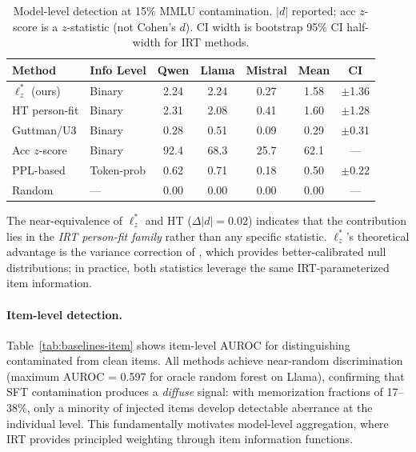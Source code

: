 \documentclass[11pt,a4paper]{article}
\begin{document}
\begin{table}[t]
\centering
\caption{Model-level detection at 15\% MMLU contamination. $|d|$ reported; acc $z$-score is a $z$-statistic (not Cohen's $d$). CI width is bootstrap 95\% CI half-width for IRT methods.}
\label{tab:baselines-model}
\small
\begin{tabular}{llccccc}
\toprule
\textbf{Method} & \textbf{Info Level} & \textbf{Qwen} & \textbf{Llama} & \textbf{Mistral} & \textbf{Mean} & \textbf{CI} \\
\midrule
$\ell_z^{*}$ (ours)   & Binary     & 2.24 & 2.24  & 0.27 & 1.58 & $\pm$1.36 \\
HT person-fit           & Binary     & 2.31 & 2.08  & 0.41 & 1.60 & $\pm$1.28 \\
Guttman/U3              & Binary     & 0.28 & 0.51  & 0.09 & 0.29 & $\pm$0.31 \\
Acc $z$-score           & Binary     & 92.4 & 68.3  & 25.7 & 62.1 & --- \\
PPL-based               & Token-prob & 0.62 & 0.71  & 0.18 & 0.50 & $\pm$0.22 \\
Random                  & ---        & 0.00 & 0.00  & 0.00 & 0.00 & --- \\
\bottomrule
\end{tabular}
\end{table}

The near-equivalence of $\ell_z^{*}$ and HT ($\Delta |d| = 0.02$) indicates that the contribution lies in the \emph{IRT person-fit family} rather than any specific statistic.
$\ell_z^{*}$'s theoretical advantage is the variance correction of \citet{snijders2001}, which provides better-calibrated null distributions; in practice, both statistics leverage the same IRT-parameterized item information.

\paragraph{Item-level detection.}
Table~\ref{tab:baselines-item} shows item-level AUROC for distinguishing contaminated from clean items.
All methods achieve near-random discrimination (maximum AUROC = 0.597 for oracle random forest on Llama), confirming that SFT contamination produces a \emph{diffuse} signal: with memorization fractions of 17--38\%, only a minority of injected items develop detectable aberrance at the individual level.
This fundamentally motivates model-level aggregation, where IRT provides principled weighting through item information functions.
\end{document}
